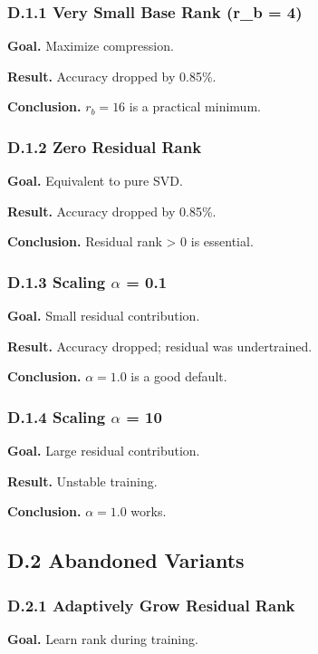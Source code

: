 \subsubsection{D.1.1 Very Small Base Rank (r\_b = 4)}

\textbf{Goal.} Maximize compression.

\textbf{Result.} Accuracy dropped by 0.85\%.

\textbf{Conclusion.} $r_b = 16$ is a practical minimum.

\subsubsection{D.1.2 Zero Residual Rank}

\textbf{Goal.} Equivalent to pure SVD.

\textbf{Result.} Accuracy dropped by 0.85\%.

\textbf{Conclusion.} Residual rank > 0 is essential.

\subsubsection{D.1.3 Scaling $\alpha$ = 0.1}

\textbf{Goal.} Small residual contribution.

\textbf{Result.} Accuracy dropped; residual was undertrained.

\textbf{Conclusion.} $\alpha = 1.0$ is a good default.

\subsubsection{D.1.4 Scaling $\alpha$ = 10}

\textbf{Goal.} Large residual contribution.

\textbf{Result.} Unstable training.

\textbf{Conclusion.} $\alpha = 1.0$ works.

\subsection{D.2 Abandoned Variants}

\subsubsection{D.2.1 Adaptively Grow Residual Rank}

\textbf{Goal.} Learn rank during training.

